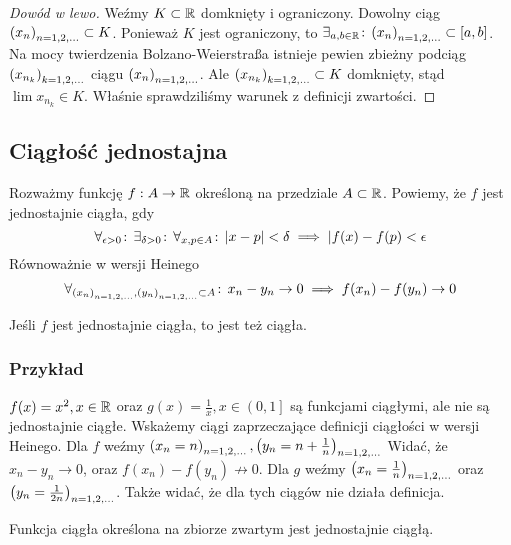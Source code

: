\documentclass[9pt]{article}
\begin{document}
\begin{proof}[Dowód w lewo]
    Weźmy $K \subset \mathbb{R}$ domknięty i ograniczony. Dowolny ciąg $\left(x_n\right)_{n = 1,2,...} \subset K$. Ponieważ $K$
    jest ograniczony, to $\exists_{a, b \in \mathbb{R}} \! : \, \left(x_n\right)_{n = 1,2,...} \subset [a,b]$. Na mocy twierdzenia
    Bolzano-Weierstraßa istnieje pewien zbieżny podciąg $\left(x_{n_k}\right)_{k = 1,2,...}$ ciągu $\left(x_n\right)_{n = 1,2,...}$. Ale 
    $\left(x_{n_k}\right)_{k = 1,2,...} \subset K$ domknięty, stąd $\lim x_{n_k} \in K$. Właśnie sprawdziliśmy
    warunek z definicji zwartości.
\end{proof}

\subsection{Ciągłość jednostajna}

\begin{Def}
    Rozważmy funkcję $f: A \to \mathbb{R}$ określoną na przedziale $A \subset \mathbb{R}$. Powiemy, że $f$ jest
    jednostajnie ciągła, gdy
    \[
        \forall_{\epsilon > 0} \! : \, \exists_{\delta > 0} \! : \, \forall_{x , p \in A} \! : \, |x-p| < \delta \implies |f(x)-f(p) < \epsilon
    \]
    Równoważnie w wersji Heinego
    \[
        \forall_{\left(x_n\right)_{n = 1,2,...}, \left(y_n\right)_{n = 1,2,...} \subset A} \! : \, x_n-y_n \to 0 \implies f(x_n) - f(y_n) \to 0
    \]
\end{Def}

Jeśli $f$ jest jednostajnie ciągła, to jest też ciągła.

\subsubsection*{Przykład}
$f(x) = x^2, x \in \mathbb{R}$ oraz $g(x) = \frac{1}{x}, x \in \left(0, 1\right]$ są funkcjami ciągłymi, ale
nie są jednostajnie ciągłe. Wskażemy ciągi zaprzeczające definicji ciągłości w wersji Heinego. Dla
$f$ weźmy $\left(x_n = n\right)_{n = 1,2,...}, \left(y_n = n+ \frac{1}{n}\right)_{n = 1,2,...}$ Widać, że $x_n - y_n \to 0$, oraz $f(x_n) -
f(y_n) \not\to 0$. Dla $g$ weźmy $\left(x_n = \frac{1}{n}\right)_{n = 1,2,...}$ oraz $\left(y_n = \frac{1}{2n}\right)_{n = 1,2,...}$. Także
widać, że dla tych ciągów nie działa definicja.

\begin{Twi}[Cantora]
    Funkcja ciągła określona na zbiorze zwartym jest jednostajnie ciągłą.
\end{Twi}
\end{document}
